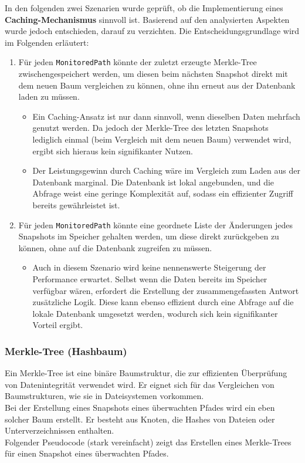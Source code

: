 \documentclass[a4paper,12pt]{report}
\begin{document}
    In den folgenden zwei Szenarien wurde geprüft, ob die Implementierung eines \textbf{Caching-Mechanismus} sinnvoll ist.
    Basierend auf den analysierten Aspekten wurde jedoch entschieden, darauf zu verzichten.
    Die Entscheidungsgrundlage wird im Folgenden erläutert:

    \begin{enumerate}
        \item Für jeden \texttt{MonitoredPath} könnte der zuletzt erzeugte Merkle-Tree zwischengespeichert werden, um diesen beim nächsten Snapshot direkt mit dem neuen Baum vergleichen zu können,
        ohne ihn erneut aus der Datenbank laden zu müssen.
        \begin{itemize}
            \item Ein Caching-Ansatz ist nur dann sinnvoll, wenn dieselben Daten mehrfach genutzt werden.
            Da jedoch der Merkle-Tree des letzten Snapshots lediglich einmal (beim Vergleich mit dem neuen Baum) verwendet wird, ergibt sich hieraus kein signifikanter Nutzen.
            \item Der Leistungsgewinn durch Caching wäre im Vergleich zum Laden aus der Datenbank marginal.
            Die Datenbank ist lokal angebunden, und die Abfrage weist eine geringe Komplexität auf, sodass ein effizienter Zugriff bereits gewährleistet ist.
        \end{itemize}
        \item Für jeden \texttt{MonitoredPath} könnte eine geordnete Liste der Änderungen jedes Snapshots im Speicher gehalten werden, um diese direkt zurückgeben zu können,
        ohne auf die Datenbank zugreifen zu müssen.
        \begin{itemize}
            \item Auch in diesem Szenario wird keine nennenswerte Steigerung der Performance erwartet.
            Selbst wenn die Daten bereits im Speicher verfügbar wären, erfordert die Erstellung der zusammengefassten Antwort zusätzliche Logik.
            Diese kann ebenso effizient durch eine Abfrage auf die lokale Datenbank umgesetzt werden, wodurch sich kein signifikanter Vorteil ergibt.
        \end{itemize}
    \end{enumerate}

    \clearpage

    \subsubsection{Merkle-Tree (Hashbaum)}
    Ein Merkle-Tree ist eine binäre Baumstruktur, die zur effizienten Überprüfung von Datenintegrität verwendet wird.
    Er eignet sich für das Vergleichen von Baumstrukturen, wie sie in Dateisystemen vorkommen.
    \\Bei der Erstellung eines Snapshots eines überwachten Pfades wird ein eben solcher Baum erstellt.
    Er besteht aus Knoten, die Hashes von Dateien oder Unterverzeichnissen enthalten.
    \\Folgender Pseudocode (stark vereinfacht) zeigt das Erstellen eines Merkle-Trees für einen Snapshot eines überwachten Pfades.
\end{document}
